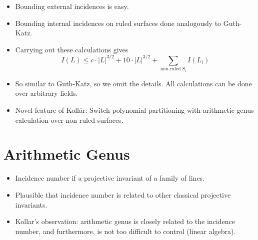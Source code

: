 \documentclass{article}
\theoremstyle{plain}
\begin{document}
\begin{itemize}
    \item Bounding external incidences is easy.
    \item Bounding internal incidences on ruled surfaces done analogously to Guth-Katz.
    \item Carrying out these calculations gives
%
\[ I(L) \leq c \cdot |L|^{3/2} + 10 \cdot |L|^{3/2} + \sum_{\text{non-ruled}\ S_i} I(L_i) \]
    \item So similar to Guth-Katz, so we omit the details. All calculations can be done over arbitrary fields.

    \item Novel feature of Koll\'{a}r: Switch polynomial partitioning with arithmetic genus calculation over non-ruled surfaces.
\end{itemize}

\section{Arithmetic Genus}

\begin{itemize}
    \item Incidence number if a projective invariant of a family of lines.

    \item Plausible that incidence number is related to other classical projective invariants.

    \item Kollar's observation: arithmetic genus is closely related to the incidence number, and furthermore, is not too difficult to control (linear algebra).
\end{itemize}
\end{document}
